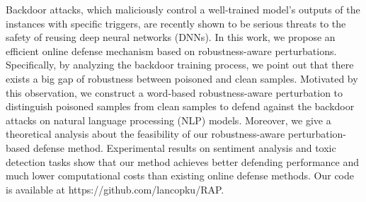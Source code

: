 Backdoor attacks, which maliciously control a well-trained model's outputs of the instances with specific triggers, are recently shown to be serious threats to the safety of reusing deep neural networks (DNNs). In this work, we propose an efficient online defense mechanism based on robustness-aware perturbations. Specifically, by analyzing the backdoor training process, we point out that there exists a big gap of robustness between poisoned and clean samples. Motivated by this observation, we construct a word-based robustness-aware perturbation to distinguish poisoned samples from clean samples to defend against the backdoor attacks on natural language processing (NLP) models. Moreover, we give a theoretical analysis about the feasibility of our robustness-aware perturbation-based defense method. Experimental results on sentiment analysis and toxic detection tasks show that our method achieves better defending performance and much lower computational costs than existing online defense methods. Our code is available at https://github.com/lancopku/RAP.
